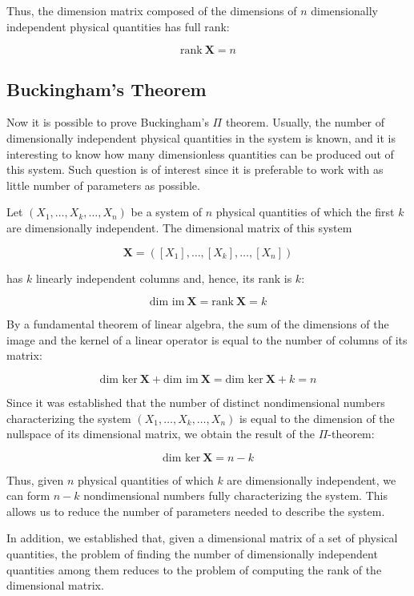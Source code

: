 Thus, the dimension matrix composed of the dimensions of $n$ dimensionally independent physical quantities has full rank:

$$ \text{rank}~ \mathbf{X} = n $$ 

\subsection{Buckingham's Theorem}

Now it is possible to prove Buckingham's $\Pi$ \-theorem. Usually, the number of dimensionally independent physical quantities in the system is known, and it is interesting to know how many dimensionless quantities can be produced out of this system. Such question is of interest since it is preferable  to work with as little number of parameters as possible.

Let $(X_1, \hdots, X_k, \hdots, X_n)$ be a system of $n$ physical quantities of which the first $k$ are dimensionally independent. The dimensional matrix of this system 

$$\mathbf{X} = ([X_1], \hdots, [X_k], \hdots, [X_n])$$

has $k$ linearly independent columns and, hence, its rank is $k$:

$$ \text{dim im} ~\mathbf{X} = \text{rank}~ \mathbf{X} = k$$ 

By a fundamental theorem of linear algebra, the sum of the dimensions of the image and the kernel of a linear operator is equal to the number of columns of its matrix:

$$ \text{dim ker}~ \mathbf{X} + \text{dim im}~ \mathbf{X} = \text{dim ker}~ \mathbf{X} + k =  n $$ 

Since it was established that the number of distinct nondimensional numbers characterizing the system $(X_1, \hdots, X_k, \hdots, X_n)$ is equal to the dimension of the nullspace of its dimensional matrix, we obtain the result of the $\Pi$-theorem:

$$ \text{dim ker}~ \mathbf{X} =  n - k $$ 

Thus, given $n$ physical quantities of which $k$ are dimensionally independent, we can form $n - k$ nondimensional numbers fully characterizing the system. This allows us to reduce the number of parameters needed to describe the system.

In addition, we established that, given a dimensional matrix of a set of physical quantities, the problem of finding the number of dimensionally independent quantities among them reduces to the problem of computing the rank of the dimensional matrix.

